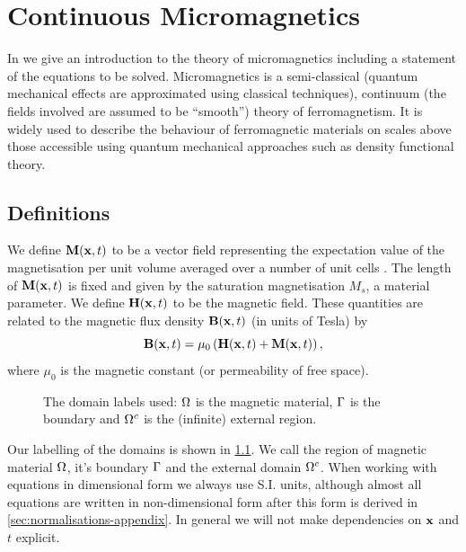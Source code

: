\chapter{Continuous Micromagnetics}
\label{sec:cont-micromag}

In  we give an introduction to the theory of micromagnetics including a statement of the equations to be solved.
Micromagnetics is a semi-classical (\ie quantum mechanical effects are approximated using classical techniques), continuum (\ie the fields involved are assumed to be ``smooth'') theory of ferromagnetism.
It is widely used to describe the behaviour of ferromagnetic materials on scales above those accessible using quantum mechanical approaches such as density functional theory.


\section{Definitions}
We define $\boldsymbol{\mathrm{M}}(\boldsymbol{\mathrm{x}},t)$ to be a vector field representing the expectation value of the magnetisation per unit volume averaged over a number of unit cells \cite{Aharoni1996}.
The length of $\boldsymbol{\mathrm{M}}(\boldsymbol{\mathrm{x}},t)$ is fixed and given by the saturation magnetisation $M_s$, a material parameter.
We define $\boldsymbol{\mathrm{H}}(\boldsymbol{\mathrm{x}},t)$ to be the magnetic field.
These quantities are related to the magnetic flux density $\boldsymbol{\mathrm{B}}(\boldsymbol{\mathrm{x}},t)$ (in units of Tesla) by
\begin{equation}
  \label{eq:37}
  \boldsymbol{\mathrm{B}}(\boldsymbol{\mathrm{x}},t) = \mu_0 \left( \boldsymbol{\mathrm{H}}(\boldsymbol{\mathrm{x}},t) + \boldsymbol{\mathrm{M}}(\boldsymbol{\mathrm{x}},t) \right),
\end{equation}
where $\mu_0$ is the magnetic constant (or permeability of free space).

\begin{figure}
  \center
  \caption{The domain labels used: $\Omega$ is the magnetic material, ${\Gamma}$ is the boundary and ${\Omega^c}$ is the (infinite) external region.} \label{fig:domain_labels}
\end{figure}

Our labelling of the domains is shown in \cref{fig:domain_labels}.
We call the region of magnetic material $\Omega$, it's boundary ${\Gamma}$ and the external domain ${\Omega^c}$.
When working with equations in dimensional form we always use S.I. units, although almost all equations are written in non-dimensional form after this form is derived in \cref{sec:normalisations-appendix}.
In general we will not make dependencies on $\boldsymbol{\mathrm{x}}$ and $t$ explicit.

